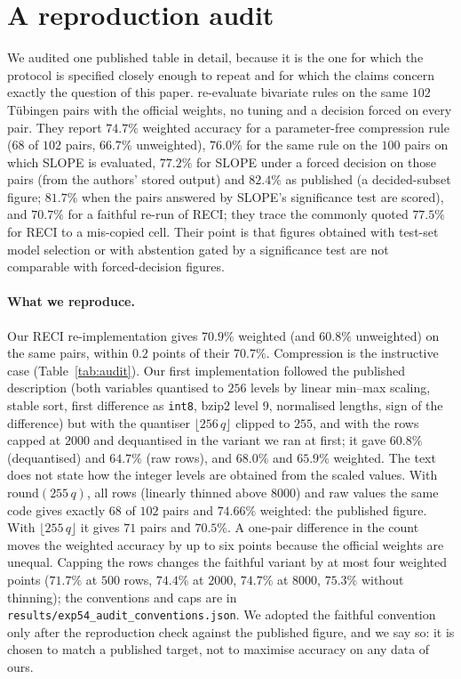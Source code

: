 \section{A reproduction audit}\label{sec:audit}

We audited one published table in detail, because it is the one for which the protocol is specified closely enough to repeat and for which the claims concern exactly the question of this paper. \citet{stienstra2026oneruler} re-evaluate bivariate rules on the same $102$ T\"ubingen pairs with the official weights, no tuning and a decision forced on every pair. They report $74.7\%$ weighted accuracy for a parameter-free compression rule ($68$ of $102$ pairs, $66.7\%$ unweighted), $76.0\%$ for the same rule on the $100$ pairs on which SLOPE \citep{marx2017slope} is evaluated, $77.2\%$ for SLOPE under a forced decision on those pairs (from the authors' stored output) and $82.4\%$ as published (a decided-subset figure; $81.7\%$ when the pairs answered by SLOPE's significance test are scored), and $70.7\%$ for a faithful re-run of RECI; they trace the commonly quoted $77.5\%$ for RECI to a mis-copied cell. Their point is that figures obtained with test-set model selection or with abstention gated by a significance test are not comparable with forced-decision figures.

\paragraph{What we reproduce.} Our RECI re-implementation gives $70.9\%$ weighted (and $60.8\%$ unweighted) on the same pairs, within $0.2$ points of their $70.7\%$. Compression is the instructive case (Table~\ref{tab:audit}). Our first implementation followed the published description (both variables quantised to $256$ levels by linear min--max scaling, stable sort, first difference as \texttt{int8}, bzip2 level 9, normalised lengths, sign of the difference) but with the quantiser $\lfloor 256\,q\rfloor$ clipped to $255$, and with the rows capped at $2000$ and dequantised in the variant we ran at first; it gave $60.8\%$ (dequantised) and $64.7\%$ (raw rows), and $68.0\%$ and $65.9\%$ weighted. The text does not state how the integer levels are obtained from the scaled values. With $\mathrm{round}(255\,q)$, all rows (linearly thinned above $8000$) and raw values the same code gives exactly $68$ of $102$ pairs and $74.66\%$ weighted: the published figure. With $\lfloor 255\,q\rfloor$ it gives $71$ pairs and $70.5\%$. A one-pair difference in the count moves the weighted accuracy by up to six points because the official weights are unequal. Capping the rows changes the faithful variant by at most four weighted points ($71.7\%$ at $500$ rows, $74.4\%$ at $2000$, $74.7\%$ at $8000$, $75.3\%$ without thinning); the conventions and caps are in \texttt{results/exp54\_audit\_conventions.json}. We adopted the faithful convention only after the reproduction check against the published figure, and we say so: it is chosen to match a published target, not to maximise accuracy on any data of ours.

